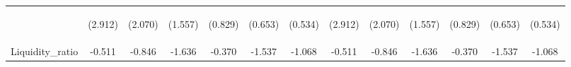 \documentclass[]{article}
\begin{document}
\begin{center}
\begin{tabular}{lcccccccccccc}
\vspace{4pt} & \begin{footnotesize}(2.912)\end{footnotesize} & \begin{footnotesize}(2.070)\end{footnotesize} & \begin{footnotesize}(1.557)\end{footnotesize} & \begin{footnotesize}(0.829)\end{footnotesize} & \begin{footnotesize}(0.653)\end{footnotesize} & \begin{footnotesize}(0.534)\end{footnotesize} & \begin{footnotesize}(2.912)\end{footnotesize} & \begin{footnotesize}(2.070)\end{footnotesize} & \begin{footnotesize}(1.557)\end{footnotesize} & \begin{footnotesize}(0.829)\end{footnotesize} & \begin{footnotesize}(0.653)\end{footnotesize} & \begin{footnotesize}(0.534)\end{footnotesize} \\
Liquidity\_ratio & -0.511 & -0.846 & -1.636 & -0.370 & -1.537 & -1.068 & -0.511 & -0.846 & -1.636 & -0.370 & -1.537 & -1.068 \\

\end{tabular}
\end{center}
\end{document}
